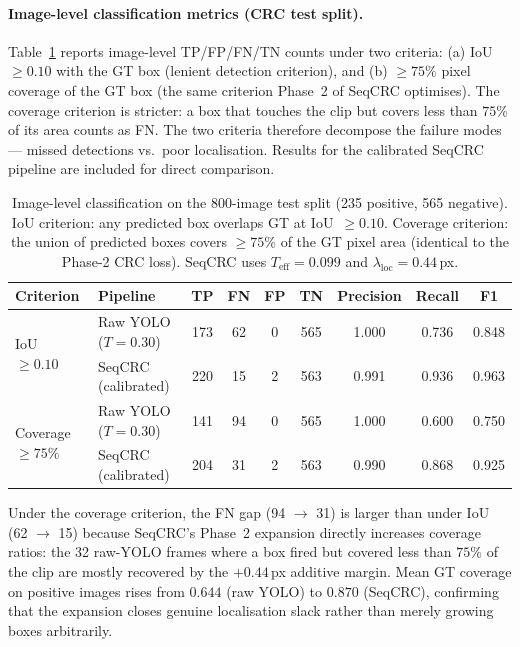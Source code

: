 \documentclass[11pt,a4paper]{article}
\begin{document}
\paragraph{Image-level classification metrics (CRC test split).}
Table~\ref{tab:yolo-image} reports image-level TP/FP/FN/TN counts under two
criteria: (a) IoU~$\ge 0.10$ with the GT box (lenient detection criterion),
and (b) $\ge 75\%$ pixel coverage of the GT box (the same criterion Phase~2 of
SeqCRC optimises). The coverage criterion is stricter: a box that touches the
clip but covers less than $75\%$ of its area counts as FN. The two criteria
therefore decompose the failure modes — missed detections vs.\ poor localisation.
Results for the calibrated SeqCRC pipeline are included for direct comparison.

\begin{table}[h]\centering
\caption{Image-level classification on the 800-image test split (235 positive,
565 negative). IoU criterion: any predicted box overlaps GT at IoU~$\ge 0.10$.
Coverage criterion: the union of predicted boxes covers $\ge 75\%$ of the GT
pixel area (identical to the Phase-2 CRC loss). SeqCRC uses
$T_{\text{eff}}{=}0.099$ and $\lambda_{\text{loc}}{=}0.44$\,px.}
\label{tab:yolo-image}
\begin{tabular}{llccccccc}
\toprule
Criterion & Pipeline & TP & FN & FP & TN & Precision & Recall & F1 \\
\midrule
\multirow{2}{*}{IoU $\ge 0.10$}
  & Raw YOLO ($T{=}0.30$) & 173 & 62 &  0 & 565 & 1.000 & 0.736 & 0.848 \\
  & SeqCRC (calibrated)   & 220 & 15 &  2 & 563 & 0.991 & 0.936 & 0.963 \\
\midrule
\multirow{2}{*}{Coverage $\ge 75\%$}
  & Raw YOLO ($T{=}0.30$) & 141 & 94 &  0 & 565 & 1.000 & 0.600 & 0.750 \\
  & SeqCRC (calibrated)   & 204 & 31 &  2 & 563 & 0.990 & 0.868 & 0.925 \\
\bottomrule
\end{tabular}
\end{table}

Under the coverage criterion, the FN gap (94 $\to$ 31) is larger than under IoU
(62 $\to$ 15) because SeqCRC's Phase~2 expansion directly increases coverage
ratios: the 32 raw-YOLO frames where a box fired but covered less than $75\%$
of the clip are mostly recovered by the $+0.44$\,px additive margin.
Mean GT coverage on positive images rises from $0.644$ (raw YOLO) to $0.870$
(SeqCRC), confirming that the expansion closes genuine localisation slack rather
than merely growing boxes arbitrarily.
\end{document}

